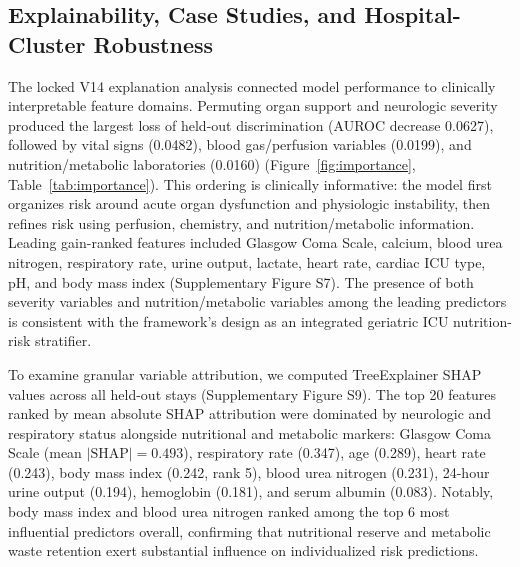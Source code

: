\documentclass[utf8]{FrontiersinVancouver}
\newcommand{\re}[1]{#1}
\begin{document}
\subsection{Explainability, Case Studies, and Hospital-Cluster Robustness}
The locked V14 explanation analysis connected model performance to clinically interpretable feature domains. Permuting organ support and neurologic severity produced the largest loss of held-out discrimination (AUROC decrease 0.0627), followed by vital signs (0.0482), blood gas/perfusion variables (0.0199), and nutrition/metabolic laboratories (0.0160) (Figure~\ref{fig:importance}, Table~\ref{tab:importance}). This ordering is clinically informative: the model first organizes risk around acute organ dysfunction and physiologic instability, then refines risk using perfusion, chemistry, and nutrition/metabolic information. Leading gain-ranked features included Glasgow Coma Scale, calcium, blood urea nitrogen, respiratory rate, urine output, lactate, heart rate, cardiac ICU type, pH, and body mass index (Supplementary Figure S7). The presence of both severity variables and nutrition/metabolic variables among the leading predictors is consistent with the framework's design as an integrated geriatric ICU nutrition-risk stratifier.

\re{To examine granular variable attribution, we computed TreeExplainer SHAP values \citep{Lundberg2020TreeSHAP} across all held-out stays (Supplementary Figure S9). The top 20 features ranked by mean absolute SHAP attribution were dominated by neurologic and respiratory status alongside nutritional and metabolic markers: Glasgow Coma Scale (mean $|\mathrm{SHAP}| = 0.493$), respiratory rate (0.347), age (0.289), heart rate (0.243), body mass index (0.242, rank 5), blood urea nitrogen (0.231), 24-hour urine output (0.194), hemoglobin (0.181), and serum albumin (0.083). Notably, body mass index and blood urea nitrogen ranked among the top 6 most influential predictors overall, confirming that nutritional reserve and metabolic waste retention exert substantial influence on individualized risk predictions.}
\end{document}
